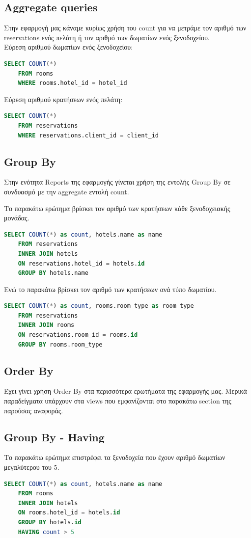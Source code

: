 \documentclass[a4paper,12pt]{article}
\begin{document}
	\subsection{Aggregate queries}
	Στην εφαρμογή μας κάναμε κυρίως χρήση του count για να μετράμε τον αριθμό των reservations ενός πελάτη ή τον αριθμό των δωματίων ενός ξενοδοχείου.\\

	Εύρεση αριθμού δωματίων ενός ξενοδοχείου:  
	\begin{lstlisting}[language=SQL]
	SELECT COUNT(*) 
	FROM rooms 
	WHERE rooms.hotel_id = hotel_id
	\end{lstlisting}
	
	Εύρεση αριθμού κρατήσεων ενός πελάτη: 
	\begin{lstlisting}[language=SQL]
	SELECT COUNT(*) 
	FROM reservations 
	WHERE reservations.client_id = client_id
	\end{lstlisting}
	
	\subsection{Group By}
	Στην ενότητα Reports της εφαρμογής γίνεται χρήση της εντολής Group By σε συνδυασμό με την aggregate εντολή count.
	
	Το παρακάτω ερώτημα βρίσκει τον αριθμό των κρατήσεων κάθε ξενοδοχειακής μονάδας.
	\begin{lstlisting}[language=SQL]
	SELECT COUNT(*) as count, hotels.name as name
	FROM reservations
	INNER JOIN hotels
	ON reservations.hotel_id = hotels.id
	GROUP BY hotels.name
	\end{lstlisting}
	Ενώ το παρακάτω βρίσκει τον αριθμό των κρατήσεων ανά τύπο δωματίου.
	\begin{lstlisting}[language=SQL]
	SELECT COUNT(*) as count, rooms.room_type as room_type
	FROM reservations
	INNER JOIN rooms
	ON reservations.room_id = rooms.id
	GROUP BY rooms.room_type
	\end{lstlisting}
	
	\subsection{Order By}
	Έχει γίνει χρήση Order By στα περισσότερα ερωτήματα της εφαρμογής μας. Μερικά παραδείγματα υπάρχουν στα views που εμφανίζονται στο παρακάτω section της παρούσας αναφοράς.
	
	\subsection{Group By - Having}
	Το παρακάτω ερώτημα επιστρέφει τα ξενοδοχεία που έχουν αριθμό δωματίων μεγαλύτερου του 5.
	\begin{lstlisting}[language=SQL]
	SELECT COUNT(*) as count, hotels.name as name
	FROM rooms
	INNER JOIN hotels
	ON rooms.hotel_id = hotels.id
	GROUP BY hotels.id
	HAVING count > 5
	\end{lstlisting}
\end{document}

